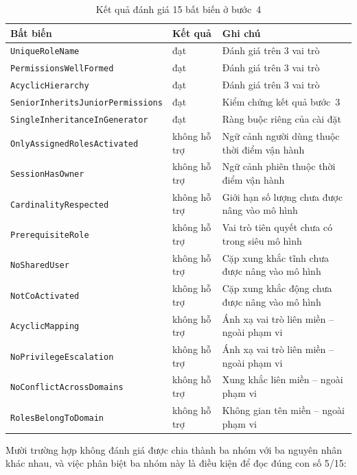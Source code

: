 \begin{table}[htbp]
\centering
\caption{Kết quả đánh giá 15 bất biến ở bước~4}
\label{tab:ket-qua-ocl}
\small
\begin{tabularx}{\textwidth}{@{}llX@{}}
\toprule
\textbf{Bất biến} & \textbf{Kết quả} & \textbf{Ghi chú} \\
\midrule
\texttt{UniqueRoleName} & đạt & Đánh giá trên 3 vai trò \\
\texttt{PermissionsWellFormed} & đạt & Đánh giá trên 3 vai trò \\
\texttt{AcyclicHierarchy} & đạt & Đánh giá trên 3 vai trò \\
\texttt{SeniorInheritsJuniorPermissions} & đạt & Kiểm chứng kết quả bước~3 \\
\texttt{SingleInheritanceInGenerator} & đạt & Ràng buộc riêng của cài đặt \\
\midrule
\texttt{OnlyAssignedRolesActivated} & không hỗ trợ & Ngữ cảnh người dùng thuộc thời điểm vận hành \\
\texttt{SessionHasOwner} & không hỗ trợ & Ngữ cảnh phiên thuộc thời điểm vận hành \\
\texttt{CardinalityRespected} & không hỗ trợ & Giới hạn số lượng chưa được nâng vào mô hình \\
\texttt{PrerequisiteRole} & không hỗ trợ & Vai trò tiên quyết chưa có trong siêu mô hình \\
\texttt{NoSharedUser} & không hỗ trợ & Cặp xung khắc tĩnh chưa được nâng vào mô hình \\
\texttt{NotCoActivated} & không hỗ trợ & Cặp xung khắc động chưa được nâng vào mô hình \\
\texttt{AcyclicMapping} & không hỗ trợ & Ánh xạ vai trò liên miền -- ngoài phạm vi \\
\texttt{NoPrivilegeEscalation} & không hỗ trợ & Ánh xạ vai trò liên miền -- ngoài phạm vi \\
\texttt{NoConflictAcrossDomains} & không hỗ trợ & Xung khắc liên miền -- ngoài phạm vi \\
\texttt{RolesBelongToDomain} & không hỗ trợ & Không gian tên miền -- ngoài phạm vi \\
\bottomrule
\end{tabularx}
\end{table}

Mười trường hợp không đánh giá được chia thành ba nhóm với ba nguyên nhân khác nhau, và việc phân biệt ba nhóm này là điều kiện để đọc đúng con số 5/15:

